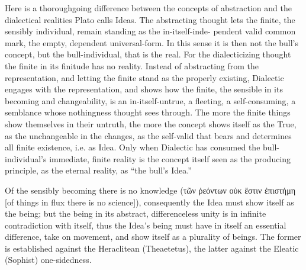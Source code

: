 \documentclass[12pt]{book}
\begin{document}
Here is a thoroughgoing difference between the concepts of abstraction and the dialectical realities
Plato calls Ideas. The abstracting thought lets the finite, the sensibly individual, remain standing
as the in-itself-inde-
pendent valid common mark, the empty, dependent universal-form. In this sense it is then not the
bull's concept, but the bull-individual, that is the real. For the dialecticizing thought the finite
in its finitude has no reality. Instead of abstracting from the representation, and letting the finite
stand as the properly existing, Dialectic engages with the representation, and shows how the finite,
the sensible in its becoming and changeability, is an in-itself-untrue, a fleeting, a self-consuming,
a semblance whose nothingness thought sees through. The more the finite things show themselves in
their untruth, the more the concept shows itself as the True, as the unchangeable in the changes, as
the self-valid that bears and determines all finite existence, i.e. as Idea. Only when Dialectic has
consumed the bull-individual's immediate, finite reality is the concept itself seen as the producing
principle, as the eternal reality, as ``the bull's Idea.''

Of the sensibly becoming there is no knowledge (τῶν ῥεόντων οὐκ ἔστιν ἐπιστήμη [of things in flux
there is no science]), consequently the Idea must show itself as the being; but the being in its
abstract, differenceless unity is in infinite contradiction with itself, thus the Idea's being must
have in itself an essential difference, take on movement, and show itself as a plurality of beings.
The former is established against the Heraclitean (Theaetetus), the latter against the Eleatic
(Sophist) one-sidedness.
\end{document}
